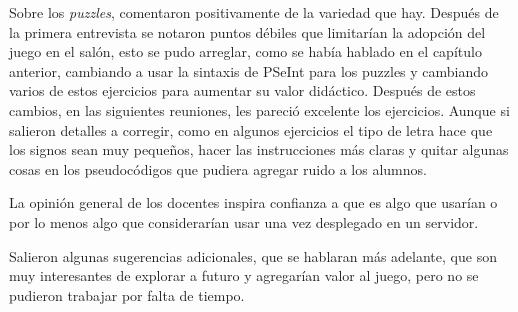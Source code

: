 Sobre los \textit{puzzles}, comentaron positivamente de la variedad que hay. Después de la primera entrevista se notaron puntos débiles que limitarían la adopción del juego en el salón, esto se pudo arreglar, como se había hablado en el capítulo anterior, cambiando a usar la sintaxis de PSeInt para los puzzles y cambiando varios de estos ejercicios para aumentar su valor didáctico. Después de estos cambios, en las siguientes reuniones, les pareció excelente los ejercicios. Aunque si salieron detalles a corregir, como en algunos ejercicios el tipo de letra hace que los signos sean muy pequeños, hacer las instrucciones más claras y quitar algunas cosas en los pseudocódigos que pudiera agregar ruido a los alumnos.

La opinión general de los docentes inspira confianza a que es algo que usarían o por lo menos algo que considerarían usar una vez desplegado en un servidor.

Salieron algunas sugerencias adicionales, que se hablaran más adelante, que son muy interesantes de explorar a futuro y agregarían valor al juego, pero no se pudieron trabajar por falta de tiempo.
